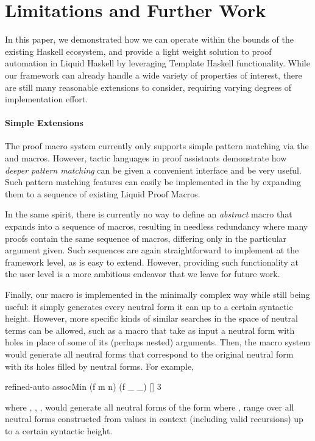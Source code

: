 \section{Limitations and Further Work}
\label{sec:future}

In this paper, we demonstrated how we can operate within the bounds of
the existing Haskell ecosystem, and provide a light weight solution to
proof automation in Liquid Haskell by leveraging Template Haskell
functionality. While our framework can already handle a wide variety
of properties of interest, there are still many reasonable extensions
to consider, requiring varying degrees of implementation effort.


\paragraph{Simple Extensions}

The proof macro system currently only supports simple pattern matching
via the  and  macros. However, tactic
languages in proof assistants demonstrate how {\em deeper pattern
  matching} can be given a convenient interface and be very
useful. Such pattern matching features can easily be implemented in
the \LangA by expanding them to a sequence of existing Liquid Proof Macros.

In the same spirit, there is currently no way to define an
\textit{abstract} macro that expands into a sequence of macros,
resulting in needless redundancy where many proofs contain the same
sequence of macros, differing only in the particular argument given.
Such sequences are again straightforward to implement at the framework
level, as \LangA is easy to extend. However, providing such
functionality at the user level is a more ambitious endeavor that we
leave for future work.

Finally, our  macro is implemented in the minimally complex way
while still being useful: it simply generates every neutral form it can up
to a certain syntactic height.  However, more specific kinds of
similar searches in the space of neutral terms can be allowed, such as
a  macro that take as input a neutral form with holes
in place of some of its (perhaps nested) arguments. Then, the macro
system would generate all neutral forms that correspond to the
original neutral form with its holes filled by neutral forms. For
example,
\begin{code}
  refined-auto {assocMin (f m n) (f _ _)} [] 3
\end{code}
where , , ,
would generate all neutral forms of the form  where 
,  range over all neutral forms constructed from values in
context (including valid recursions) up to a certain syntactic height.

